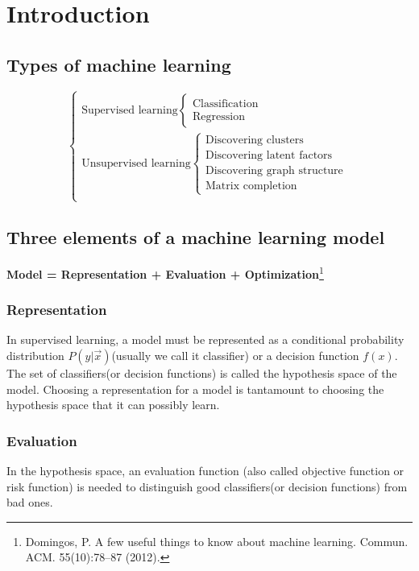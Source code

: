 \chapter{Introduction}

\section{Types of machine learning}
\begin{equation}\nonumber
\begin{cases}
\text{Supervised learning} \begin{cases} \text{Classification} \\ \text{Regression} \end{cases}\\
\text{Unsupervised learning} \begin{cases} \text{Discovering clusters} \\ \text{Discovering latent factors} \\ \text{Discovering graph structure} \\ \text{Matrix completion} \end{cases}\\
\end{cases}
\end{equation}


\section{Three elements of a machine learning model}

\textbf{Model = Representation + Evaluation + Optimization}\footnote{Domingos, P. A few useful things to know about machine learning. Commun. ACM. 55(10):78–87 (2012).}


\subsection{Representation}
In supervised learning, a model must be represented as a conditional probability distribution $P(y|\vec{x})$(usually we call it classifier) or a decision function $f(x)$. The set of classifiers(or decision functions) is called the hypothesis space of the model. Choosing a representation for a model is tantamount to choosing the hypothesis space that it can possibly learn. 


\subsection{Evaluation}
In the hypothesis space, an evaluation function (also called objective function or risk function) is needed to distinguish good classifiers(or decision functions) from bad ones.


